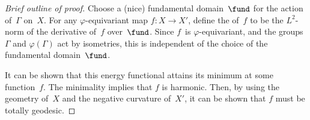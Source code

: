 \begin{proof}[Brief outline of proof]
Choose a (nice) fundamental domain~$\fund$ for the action of~$\Gamma$ on~$X$. For any $\varphi$-equivariant map $f \colon X \to X'$, define the  of~$f$ to be the $L^2$-norm of the derivative of~$f$ over~$\fund$. Since $f$~is $\varphi$-equivariant, and the groups $\Gamma$ and $\varphi(\Gamma)$ act by isometries, this is independent of the choice of the fundamental domain~$\fund$.

It can be shown that this energy functional attains its minimum at some function~$f$. The minimality implies that $f$ is harmonic. Then, by using the geometry of~$X$ and the negative curvature of~$X'$, it can be shown that $f$ must be totally geodesic.
\end{proof}




